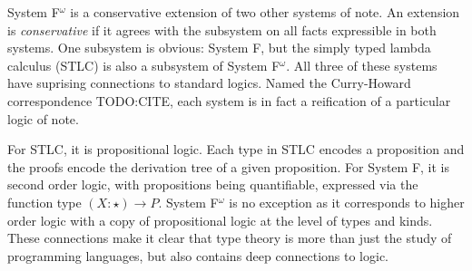 System F$^\omega$ is a conservative extension of two other systems of note.
An extension is \textit{conservative} if it agrees with the subsystem on all facts expressible in both systems.
One subsystem is obvious: System F, but the simply typed lambda calculus (STLC) is also a subsystem of System F$^\omega$.
All three of these systems have suprising connections to standard logics.
Named the Curry-Howard correspondence TODO:CITE, each system is in fact a reification of a particular logic of note.

For STLC, it is propositional logic.
Each type in STLC encodes a proposition and the proofs encode the derivation tree of a given proposition.
For System F, it is second order logic, with propositions being quantifiable, expressed via the function type $(X : \star) \to P$.
System F$^\omega$ is no exception as it corresponds to higher order logic with a copy of propositional logic at the level of types and kinds.
These connections make it clear that type theory is more than just the study of programming languages, but also contains deep connections to logic.






